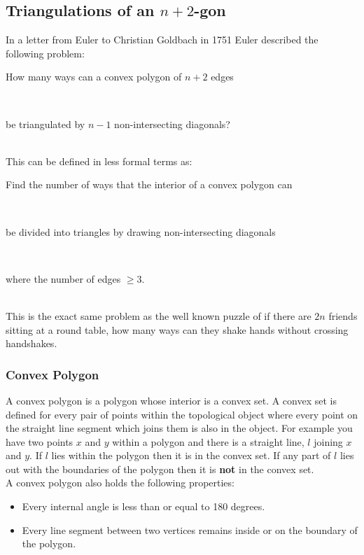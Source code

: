 \documentclass[12pt]{article}
\begin{document}

\subsection{Triangulations of an $n+2$-gon}
\label{sec:n+2gonTriangulation}
In a letter from Euler to Christian Goldbach in 1751 Euler described the following problem:\\
\centerline{How many ways can a convex polygon of $n + 2$ edges}\\
\centerline{be triangulated by $n - 1$ non-intersecting diagonals?}\\
This can be defined in less formal terms as:\\
\centerline{Find the number of ways that the interior of a convex polygon can}\\
\centerline{be divided into triangles by drawing non-intersecting diagonals}\\
\centerline{where the number of edges $\geq 3$.}\\
This is the exact same problem as the well known puzzle of if there are $2n$ friends sitting at a round table, how many ways can they shake hands without crossing handshakes.

\subsubsection{Convex Polygon}
A convex polygon is a polygon whose interior is a convex set. A convex set is defined for every pair of points within the topological object where every point on the straight line segment which joins them is also in the object. For example you have two points $x$ and $y$ within a polygon and there is a straight line, $l$ joining $x$ and $y$. If $l$ lies within the polygon then it is in the convex set. If any part of $l$ lies out with the boundaries of the polygon then it is {\bf not} in the convex set.\\
A convex polygon also holds the following properties:
\begin{itemize}
\item Every internal angle is less than or equal to 180 degrees.
\item Every line segment between two vertices remains inside or on the boundary of the polygon.
\end{itemize}
\end{document}
